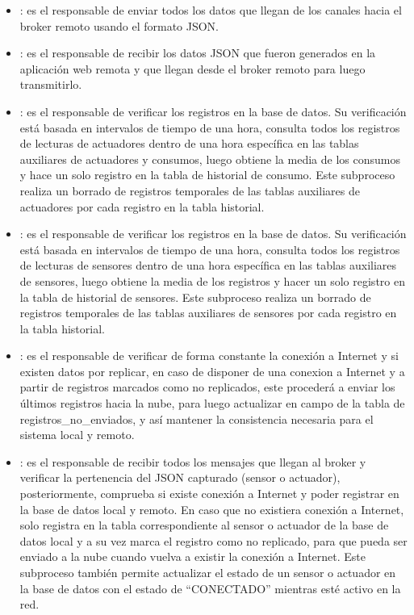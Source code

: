 \begin{itemize}
\item {}: es el responsable de enviar todos los datos que llegan de los canales hacia el broker remoto usando el formato JSON.

\item {}: es el responsable de recibir los datos JSON que fueron generados en la aplicación web remota y que llegan desde el broker remoto para luego transmitirlo.

\item {}: es el responsable de verificar los registros en la base de datos. Su verificación está basada en intervalos de tiempo de una hora, consulta todos los registros de lecturas de actuadores dentro de una hora específica en las tablas auxiliares de actuadores y consumos, luego obtiene la media de los consumos y hace un solo registro en la tabla de historial de consumo. Este subproceso realiza un borrado de registros temporales de las tablas auxiliares de actuadores por cada registro en la tabla historial.

\item {}: es el responsable de verificar los registros en la base de datos. Su verificación está basada en intervalos de tiempo de una hora, consulta todos los registros de lecturas de sensores dentro de una hora específica en las tablas auxiliares de sensores, luego obtiene la media de los registros y hacer un solo registro en la tabla de historial de sensores. Este subproceso realiza un borrado de registros temporales de las tablas auxiliares de sensores por cada registro en la tabla historial.

\item {}: es el responsable de verificar de forma constante la conexión a Internet y si existen datos por replicar, en caso de disponer de una conexion a Internet y a partir de registros marcados como no replicados, este procederá a enviar los últimos registros hacia la nube, para luego actualizar en campo de la tabla de registros\_no\_enviados, y así mantener la consistencia necesaria para el sistema local y remoto.

\item {}: es el responsable de recibir todos los mensajes que llegan al broker y verificar la pertenencia del JSON capturado (sensor o actuador), posteriormente, comprueba si existe conexión a Internet y poder registrar en la base de datos local y remoto. En caso que no existiera conexión a Internet, solo registra en la tabla correspondiente al sensor o actuador de la base de datos local y a su vez marca el registro como no replicado, para que pueda ser enviado a la nube cuando vuelva a existir la conexión a Internet. Este subproceso también permite actualizar el estado de un sensor o actuador en la base de datos con el estado de ``CONECTADO'' mientras esté activo en la red.


\end{itemize}
